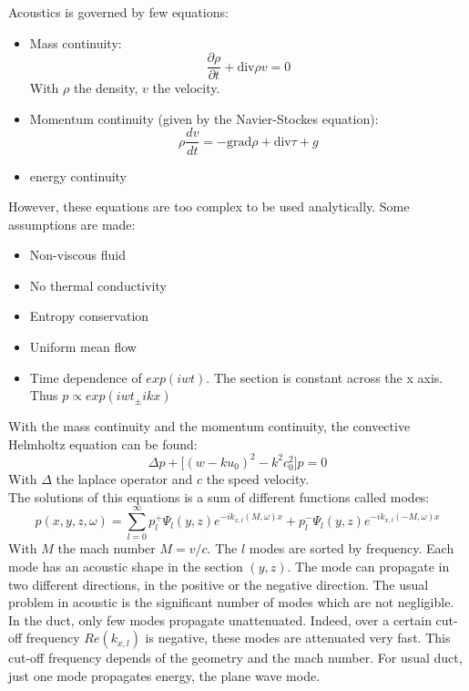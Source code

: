 Acoustics is governed by few equations:
\begin{itemize}
    \item Mass continuity: 
        \begin{equation} 
        \frac{\partial \rho}{\partial t}+\mathrm{div}\rho v =0
        \end{equation}
    With $\rho$ the density, $v$ the velocity.
    \item Momentum continuity (given by the Navier-Stockes equation):
        \begin{equation} 
        \rho\frac{dv}{dt}=-\mathrm{grad} \rho+\mathrm{div} \tau+g
        \end{equation}
    \item energy continuity
\end{itemize}
However, these equations are too complex to be used analytically. Some assumptions are made:
\begin{itemize}
    \item Non-viscous fluid
    \item No thermal conductivity
    \item Entropy conservation
    \item Uniform mean flow
    \item Time dependence of $exp(iwt)$. The section is constant across the x axis. Thus $p\propto exp(iwt_\pm ikx)$
\end{itemize}
With the mass continuity and the momentum continuity, the convective Helmholtz equation can be found: 
    \begin{equation} 
    \Delta p +\Big[(w-ku_0)^2-k^2c_0^2\Big]p=0
    \end{equation}
With $\Delta$ the laplace operator and $c$ the speed velocity.\\
The solutions of this equations is a sum of different functions called modes: 
\begin{equation} 
    p(x,y,z,\omega)=\sum_{l=0}^\infty p_l^+ \Psi_l(y,z)e^{-ik_{x,l}(M,\omega)x}+p_l^- \Psi_l(y,z)e^{-ik_{x,l}(-M,\omega)x}
    \label{Convective_Helmholtz_Equation}
\end{equation}
With $M$ the mach number $M={v}/{c}$. The $l$ modes are sorted by frequency. Each mode has an acoustic shape in the section $(y,z)$. The mode can propagate in two different directions, in the positive or the negative direction.
The usual problem in acoustic is the significant number of modes which are not negligible. In the duct, only few modes propagate unattenuated. Indeed, over a certain cut-off frequency $Re(k_{x,l})$ is negative, these modes are attenuated very fast. This cut-off frequency depends of the geometry and the mach number. For usual duct, just one mode propagates energy, the plane wave mode.
